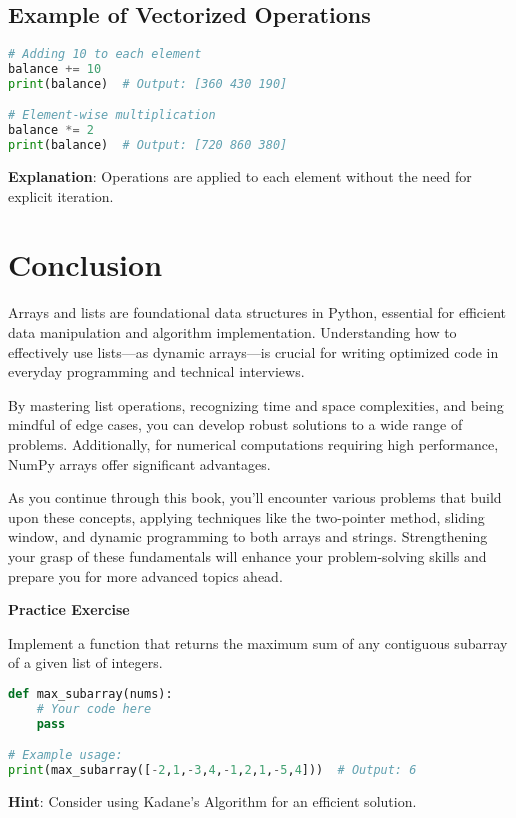 \subsection{Example of Vectorized Operations}\label{subsec:vectorized_operations}

\begin{fullwidth}
\begin{lstlisting}[language=Python, caption=Vectorized operations with NumPy arrays]
# Adding 10 to each element
balance += 10
print(balance)  # Output: [360 430 190]

# Element-wise multiplication
balance *= 2
print(balance)  # Output: [720 860 380]
\end{lstlisting}
\end{fullwidth}

\textbf{Explanation}: Operations are applied to each element without the need for explicit iteration.

\section{Conclusion}\label{sec:arrays_conclusion}

Arrays and lists are foundational data structures in Python, essential for efficient data manipulation and algorithm implementation. Understanding how to effectively use lists—as dynamic arrays—is crucial for writing optimized code in everyday programming and technical interviews.

By mastering list operations, recognizing time and space complexities, and being mindful of edge cases, you can develop robust solutions to a wide range of problems. Additionally, for numerical computations requiring high performance, NumPy arrays offer significant advantages.

As you continue through this book, you'll encounter various problems that build upon these concepts, applying techniques like the two-pointer method, sliding window, and dynamic programming to both arrays and strings. Strengthening your grasp of these fundamentals will enhance your problem-solving skills and prepare you for more advanced topics ahead.

\textbf{Practice Exercise}\label{exercise:max_subarray}

Implement a function that returns the maximum sum of any contiguous subarray of a given list of integers.

\begin{fullwidth}
\begin{lstlisting}[language=Python, caption=Practice exercise: Maximum subarray]
def max_subarray(nums):
    # Your code here
    pass

# Example usage:
print(max_subarray([-2,1,-3,4,-1,2,1,-5,4]))  # Output: 6
\end{lstlisting}
\end{fullwidth}

\textbf{Hint}: Consider using Kadane's Algorithm for an efficient solution.